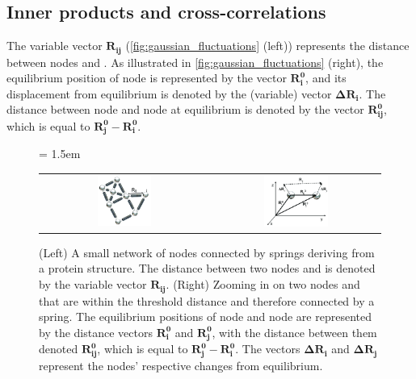 \subsection{Inner products and cross-correlations}

The variable vector $\mathbf{R_{ij}}$ (\autoref{fig:gaussian_fluctuations} (left)) represents the distance between nodes  and . As illustrated in \autoref{fig:gaussian_fluctuations} (right), the equilibrium position of node  is represented by the vector $\mathbf{R_i^0}$, and its displacement from equilibrium is denoted by the (variable) vector $ \mathbf{\Delta R_i}$. The distance between node  and node  at equilibrium is denoted by the vector $\mathbf{R_{ij}^0}$, which is equal to $\mathbf{R_j^0} - \mathbf{R_i^0}$.

\begin{figure}[h]
	\centering
	\tabcolsep = 1.5em
	\mySfFamily
	\begin{tabular}{c c}
		\includegraphics[width = 0.33\textwidth]{../images_CMYK/gaussian_network_small} & \includegraphics[width = 0.4\textwidth]{../images_CMYK/gaussian_network_vectors}
	\end{tabular}
	\caption{(Left) A small network of nodes connected by springs deriving from a protein structure. The distance between two nodes  and  is denoted by the variable vector $\textbf{R}_\textbf{ij}$. (Right) Zooming in on two nodes  and  that are within the threshold distance and therefore connected by a spring. The equilibrium positions of node  and node  are represented by the distance vectors $ \textbf{R}_\textbf{i}^\textbf{0} $ and $\textbf{R}_\textbf{j}^\textbf{0}$, with the distance between them denoted $\textbf{R}_{\textbf{ij}}^\textbf{0}$, which is equal to $\textbf{R}_\textbf{j}^\textbf{0} - \textbf{R}_\textbf{i}^\textbf{0}$. The vectors $\mathbf{\Delta} \textbf{R}_\textbf{i} $ and $ \mathbf{\Delta} \textbf{R}_\textbf{j}$ represent the nodes' respective changes from equilibrium.}
	\label{fig:gaussian_fluctuations}
\end{figure}

